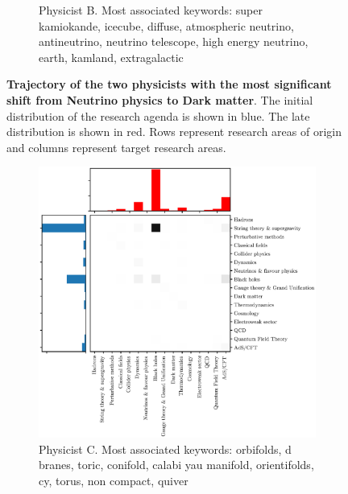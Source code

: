 \documentclass{article}
\begin{document}
\begin{figure}[h]
\begin{subfigure}{0.45\textwidth}
    \caption{Physicist B. Most associated keywords: super kamiokande, icecube, diffuse, atmospheric neutrino, antineutrino, neutrino telescope, high energy neutrino, earth, kamland, extragalactic}
    \label{fig:J.F.Beacom.1}
\end{subfigure}
\caption{\textbf{Trajectory of the two physicists with the most significant shift from Neutrino physics to Dark matter}. The initial distribution of the research agenda is shown in blue. The late distribution is shown in red. Rows represent research areas of origin and columns represent target research areas.}
\label{fig:turns_neutrinos_dm}
\end{figure}

\begin{figure}[h]
\begin{subfigure}{.45\textwidth}
    \includegraphics[width=1.15\textwidth]{plots/trajectory_example_T.Sarkar.1.eps}
    \caption{Physicist C. Most associated keywords: orbifolds, d branes, toric, conifold, calabi yau manifold, orientifolds, cy, torus, non compact, quiver}
    \label{fig:T.Sarkar.1}
\end{subfigure}\hfill%
\begin{subfigure}{0.45\textwidth}

\end{subfigure}
\end{figure}
\end{document}
